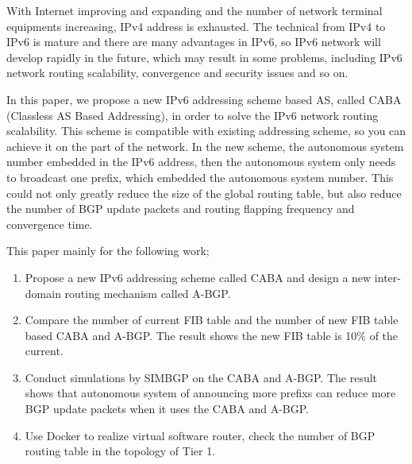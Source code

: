 \begin{eabstract}
With Internet improving and expanding and the number of network terminal equipments increasing, IPv4 address is exhausted. The technical from IPv4 to IPv6 is mature and there are many advantages in IPv6, so IPv6 network will develop rapidly in the future, which may result in some problems, including IPv6 network routing scalability, convergence and security issues and so on.

In this paper, we propose a new IPv6 addressing scheme based AS, called CABA (Classless AS Based Addressing), in order to solve the IPv6 network routing scalability. This scheme is compatible with existing addressing scheme, so you can achieve it on the part of the network. In the new scheme, the autonomous system number embedded in the IPv6 address, then the autonomous system only needs to broadcast one prefix, which embedded the autonomous system number. This could not only greatly reduce the size of the global routing table, but also reduce the number of BGP update packets and routing flapping frequency and convergence time.

This paper mainly for the following work;


\begin{enumerate}
\item Propose a new IPv6 addressing scheme called CABA and design a new inter-domain routing mechanism called A-BGP.
\item Compare the number of current FIB table and the number of new FIB table based CABA and A-BGP. The result shows the new FIB table is 10\% of the current.
\item Conduct simulations by SIMBGP on the CABA and A-BGP. The result shows that autonomous system of announcing more prefixs can reduce more BGP update packets when it uses the CABA and A-BGP.
\item Use Docker to realize virtual software router, check the number of BGP routing table in the topology of Tier 1.
\end{enumerate}

\end{eabstract}

